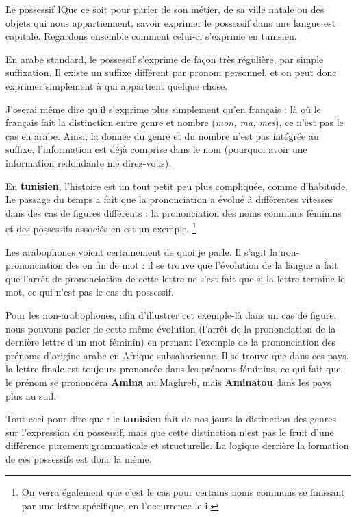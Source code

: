 \h{Le possessif}
\l{Q}ue ce soit pour parler de son métier, de sa ville natale ou des objets qui nous appartiennent, savoir exprimer le possessif dans une langue est capitale. Regardons ensemble comment celui-ci s'exprime en tunisien.

En arabe standard, le possessif s'exprime de façon très régulière, par simple suffixation. Il existe un suffixe différent par pronom personnel, et on peut donc exprimer simplement à qui appartient quelque chose. 

J'oserai même dire qu'il s'exprime plus simplement qu'en français : là où le français fait la distinction entre genre et nombre (\textit{mon, ma, mes}), ce n'est pas le cas en arabe. Ainsi, la donnée du genre et du nombre n'est pas intégrée au suffixe, l'information est déjà comprise dans le nom (pourquoi avoir une information redondante me direz-vous).

En \textbf{tunisien}, l'histoire est un tout petit peu plus compliquée, comme d'habitude. Le passage du temps a fait que la prononciation a évolué à différentes vitesses dans des cas de figures différents : la prononciation des noms communs féminins et des possessifs associés en est un exemple. \footnote{On verra également que c'est le cas pour certains noms communs se finissant par une lettre spécifique, en l'occurrence le \textbf{i}.}

Les arabophones voient certainement de quoi je parle. Il s'agit la non-prononciation des  en fin de mot : il se trouve que l'évolution de la langue a fait que l'arrêt de prononciation de cette lettre ne s'est fait que si la lettre termine le mot, ce qui n'est pas le cas du possessif. 

Pour les non-arabophones, afin d'illustrer cet exemple-là dans un cas de figure, nous pouvons parler de cette même évolution (l'arrêt de la prononciation de la dernière lettre d'un mot féminin) en prenant l'exemple de la prononciation des prénoms d'origine arabe en Afrique subsaharienne. Il se trouve que dans ces pays, la lettre finale est toujours prononcée dans les prénoms féminins, ce qui fait que le prénom  se prononcera \textbf{Amina} au Maghreb, mais \textbf{Aminatou} dans les pays plus au sud.

Tout ceci pour dire que : le \textbf{tunisien} fait de nos jours la distinction des genres sur l'expression du possessif, mais que cette distinction n'est pas le fruit d'une différence purement grammaticale et structurelle. La logique derrière la formation de ces possessifs est donc la même.

